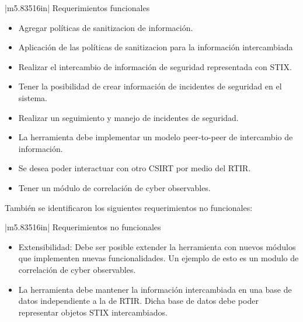 \documentclass[11pt]{article}
\makeatletter
\newcommand\arraybslash{\let\\\@arraycr}
\makeatother
\begin{document}
\begin{flushleft}
\tablefirsthead{}
\tablehead{}
\tabletail{}
\tablelasttail{}
\begin{supertabular}{|m{5.83516in}|}
\hline
\centering\arraybslash Requerimientos funcionales\\\hline
\begin{itemize}
\item Agregar políticas de sanitizacion de información.
\item Aplicación de las políticas de sanitizacion para la información intercambiada
\item Realizar el intercambio de información de seguridad representada con STIX.
\item Tener la posibilidad de crear información de incidentes de seguridad en el sistema.
\item Realizar un seguimiento y manejo de incidentes de seguridad.
\item La herramienta debe implementar un modelo peer-to-peer de intercambio de información.
\item Se desea poder interactuar con otro CSIRT por medio del RTIR.
\item Tener un módulo de correlación de cyber observables.
\end{itemize}
\\\hline
\end{supertabular}
\end{flushleft}

También se identificaron los siguientes requerimientos no funcionales:


\begin{flushleft}
\tablefirsthead{}
\tablehead{}
\tabletail{}
\tablelasttail{}
\begin{supertabular}{|m{5.83516in}|}
\hline
\centering\arraybslash Requerimientos no funcionales\\\hline
\begin{itemize}
\item Extensibilidad: Debe ser posible extender la herramienta con nuevos módulos que implementen nuevas funcionalidades. Un ejemplo de esto es un modulo de correlación de cyber observables.
\item La herramienta debe mantener la información intercambiada en una base de datos independiente a la de RTIR. Dicha base de datos debe poder representar objetos STIX intercambiados.
\end{itemize}
\\\hline
\end{supertabular}
\end{flushleft}
\end{document}
